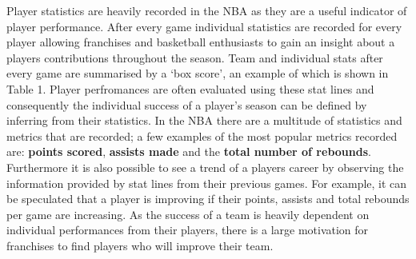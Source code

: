 \documentclass[a4paper,11pt,twoside]{article}
\begin{document}
Player statistics are heavily recorded in the NBA as they are a useful indicator of player performance. After every game individual statistics are recorded for every player allowing franchises and basketball enthusiasts to gain an insight about a players contributions throughout the season. Team and individual stats after every game are summarised by a `box score', an example of which is shown in Table 1. Player perfromances are often evaluated using these stat lines and consequently the individual success of a player's season can be defined by inferring from their statistics. In the NBA there are a multitude of statistics and metrics that are recorded; a few examples of the most popular metrics recorded are: \textbf{points scored}, \textbf{assists made} and the \textbf{total number of rebounds}. Furthermore it is also possible to see a trend of a players career by observing the information provided by stat lines from their previous games. For example, it can be speculated that a player is improving if their points, assists and total rebounds per game are increasing. As the success of a team is heavily dependent on individual performances from their players, there is a large motivation for franchises to find players who will improve their team. %
\vspace{5mm}
\begin{table} [h!]
\captionsetup{justification=centering}
\begin{center}
\end{center}
\caption{An Example of an NBA Box Score showing the stats of the Oklahoma City Thunder players who started the game}
\end{table}
\end{document}
